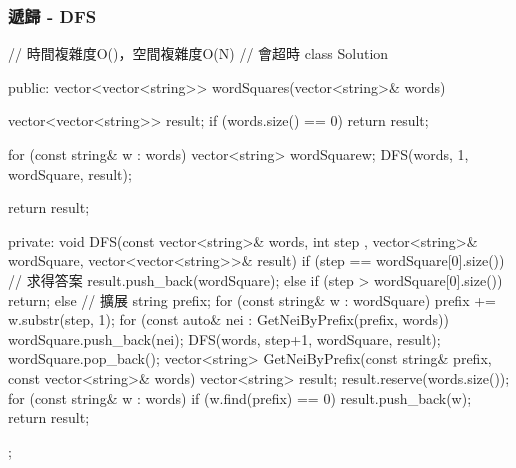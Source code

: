 \subsubsection{遞歸 - DFS}
\begin{Code}
// 時間複雜度O()，空間複雜度O(N)
// 會超時
class Solution {
public:
    vector<vector<string>> wordSquares(vector<string>& words) {
        vector<vector<string>> result;
        if (words.size() == 0) return result;

        for (const string& w : words)
        {
            vector<string> wordSquare{w};
            DFS(words, 1, wordSquare, result);
        }

        return result;
    }
private:
    void DFS(const vector<string>& words, int step
             , vector<string>& wordSquare, vector<vector<string>>& result)
    {
        if (step == wordSquare[0].size())
        {
            // 求得答案
            result.push_back(wordSquare);
        }
        else if (step > wordSquare[0].size())
            return;
        else
        {
            // 擴展
            string prefix;
            for (const string& w : wordSquare)
                prefix += w.substr(step, 1);
            for (const auto& nei : GetNeiByPrefix(prefix, words))
            {
                wordSquare.push_back(nei);
                DFS(words, step+1, wordSquare, result);
                wordSquare.pop_back();
            }
        }
    }
    vector<string> GetNeiByPrefix(const string& prefix, const vector<string>& words)
    {
        vector<string> result; result.reserve(words.size());
        for (const string& w : words)
        {
            if (w.find(prefix) == 0) result.push_back(w);
        }
        return result;
    }
};
\end{Code}


